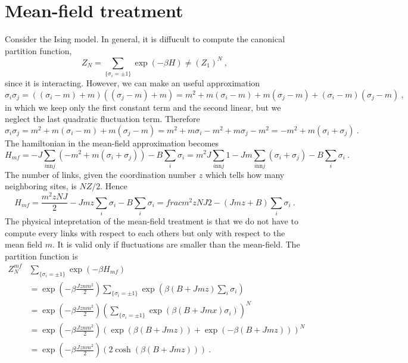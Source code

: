 \chapter{Mean-field treatment} 

    Consider the Ising model. In general, it is diffucult to compute the canonical partition function,
    \begin{equation*}
        Z_N = \sum_{\{\sigma_i = \pm 1\}} \exp(- \beta H) \neq (Z_1)^N ~,
    \end{equation*}
    since it is interacting. However, we can make an useful approximation 
    \begin{equation*}
        \sigma_i \sigma_j = ((\sigma_i - m) + m)((\sigma_j - m) + m) = m^2 + m(\sigma_i - m) + m (\sigma_j - m) + (\sigma_i - m)(\sigma_j - m) ~,
    \end{equation*}
    in which we keep only the first constant term and the second linear, but we neglect the last quadratic fluctuation term. Therefore 
    \begin{equation*}
        \sigma_i \sigma_j =  m^2 + m(\sigma_i - m) + m (\sigma_j - m) = m^2 + m\sigma_i - m^2 + m \sigma_j - m^2 = - m^2 + m (\sigma_i + \sigma_j) ~.
    \end{equation*}
    The hamiltonian in the mean-field approximation becomes 
    \begin{equation*}
        H_{mf} = - J \sum_{i \text{nn} j} (- m^2 + m(\sigma_i + \sigma_j)) - B \sum_i \sigma_i = m^2 J \sum_{i \text{nn} j} 1 - J m \sum_{i \text{nn} j} (\sigma_i + \sigma_j) - B \sum_i \sigma_i ~.
    \end{equation*}
    The number of links, given the coordination number $z$ which tells how many neighboring sites, is $NZ/2$. Hence 
    \begin{equation*}
        H_{mf} = \frac{m^2 z N J}{2} - Jmz \sum_i \sigma_i - B \sum_i \sigma_i = frac{m^2 z N J}{2} - (J m z + B) \sum_i \sigma_i ~.
    \end{equation*}
    The physical intepretation of the mean-field treatment is that we do not have to compute every links with respect to each others but only with respect to the mean field $m$. It is valid only if fluctuations are smaller than the mean-field. The partition function is 
    \begin{equation*}
    \begin{aligned}
        Z_N^{mf} & \sum_{\{\sigma_i = \pm 1\}} \exp(- \beta H_{mf}) \\ & = \exp(- \beta \frac{J z n m^2}{2}) \sum_{\{\sigma_i = \pm 1\}} \exp(\beta (B + Jmz) \sum_i \sigma_i) \\ & = \exp(- \beta \frac{J z n m^2}{2}) (\sum_{\{\sigma_i = \pm 1\}} \exp(\beta (B + Jmx) \sigma_i))^N \\ & = \exp(- \beta \frac{J z n m^2}{2}) (\exp(\beta(B + Jmz)) + \exp(- \beta (B + Jmz)))^N \\ & = \exp(- \beta \frac{J z n m^2}{2}) (2 \cosh (\beta (B + Jmz))) ~.
    \end{aligned}
    \end{equation*}
